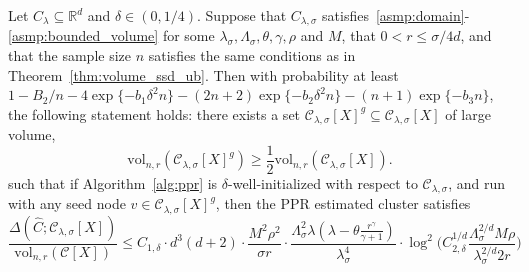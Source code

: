 \documentclass[twoside,11pt]{article}
\newcommand{\Reals}{\mathbb{R}}
\newcommand{\1}{\mathbf{1}}
\newcommand{\Rd}{\Reals^d}
\newcommand{\mc}[1]{\mathcal{#1}}
\newcommand{\wh}[1]{\widehat{#1}}
\newcommand{\vol}{\mathrm{vol}}
\begin{document}
\begin{theorem}
	\label{thm:density_cluster_volume_ssd_ub}
	Let $C_{\lambda} \subseteq \Rd$ and $\delta \in (0,1/4)$. Suppose that $C_{\lambda,\sigma}$ satisfies~\ref{asmp:domain}-\ref{asmp:bounded_volume} for some $\lambda_{\sigma}, \Lambda_{\sigma}, \theta, \gamma, \rho$ and $M$, that $0 < r \leq \sigma/4d$, and that the sample size $n$ satisfies the same conditions as in Theorem~\ref{thm:volume_ssd_ub}. Then with probability at least $1 - B_2/n - 4\exp\{-b_1\delta^2n\} - (2n + 2)\exp\{-b_2\delta^2n\} - (n + 1)\exp\{-b_3n\}$, the following statement holds: there exists a set $\mc{C}_{\lambda,\sigma}[X]^g \subseteq \mc{C}_{\lambda,\sigma}[X]$ of large volume, 
	$$
	\vol_{n,r}(\mc{C}_{\lambda,\sigma}[X]^g) \geq \frac{1}{2} \vol_{n,r}(\mc{C}_{\lambda,\sigma}[X]).
	$$ 
	such that if Algorithm~\ref{alg:ppr} is $\delta$-well-initialized with respect to $\mc{C}_{\lambda,\sigma}$, and run with any seed node $v \in \mc{C}_{\lambda,\sigma}[X]^g$, then the PPR estimated cluster \smash{$\wh{C}$} satisfies
	\begin{equation}
	\label{eqn:density_cluster_volume_ssd_ub}
	\frac{\Delta(\wh{C};\mc{C}_{\lambda,\sigma}[X])}{\vol_{n,r}(\mc{C}[X])} \leq C_{1,\delta} \cdot d^3(d + 2) \cdot \frac{M^2\rho^2}{\sigma r} \cdot \frac{\Lambda_{\sigma}^2 \lambda (\lambda - \theta \frac{r^{\gamma}}{\gamma + 1})}{\lambda_{\sigma}^4} \cdot \log^2\biggl(C_{2,\delta}^{1/d} \frac{\Lambda_{\sigma}^{2/d} M\rho}{\lambda_{\sigma}^{2/d}2r}\biggr)
	\end{equation}
\end{theorem}
\end{document}
